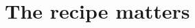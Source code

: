 \documentclass{article}
\begin{document}
\section{The recipe matters}
\label{sec:recipe}

\end{document}
